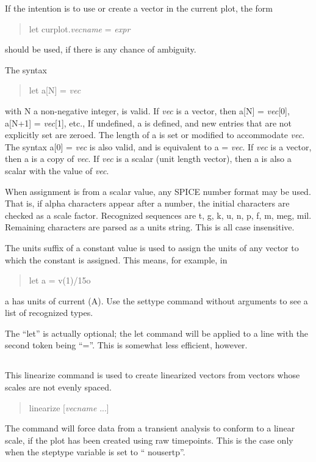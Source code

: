 If the intention is to use or create a vector in the current plot,
the form
\begin{quote}
{\vt let curplot}.{\it vecname} {\vt =} {\it expr}
\end{quote}
should be used, if there is any chance of ambiguity.

The syntax
\begin{quote}
{\vt let a[N] = {\it vec\/}}
\end{quote}
with {\vt N} a non-negative integer, is valid.  If {\it vec\/} is a
vector, then {\vt a[N] = {\it vec\/}[0]}, {\vt a[N+1] = {\it
vec\/}[1]}, etc., If undefined, {\vt a} is defined, and new entries
that are not explicitly set are zeroed.  The length of {\vt a} is set
or modified to accommodate {\it vec\/}.  The syntax {\vt a[0] = {\it
vec\/}} is also valid, and is equivalent to {\vt a = {\it vec\/}}.  If
{\it vec\/} is a vector, then {\vt a} is a copy of {\it vec\/}.  If
{\it vec\/} is a scalar (unit length vector), then {\vt a} is also a
scalar with the value of {\it vec\/}. 

When assignment is from a scalar value, any SPICE number format may be
used.  That is, if alpha characters appear after a number, the initial
characters are checked as a scale factor.  Recognized sequences are t,
g, k, u, n, p, f, m, meg, mil.  Remaining characters are parsed as a
units string.  This is all case insensitive.

The units suffix of a constant value is used to assign the units
of any vector to which the constant is assigned.  This means, for
example, in
\begin{quote}\vt
    let a = v(1)/15o
\end{quote}
{\vt a} has units of current (A).  Use the {\cb settype} command
without arguments to see a list of recognized types.

The ``let'' is actually optional; the {\cb let} command will be
applied to a line with the second token being ``=''.  This is somewhat
less efficient, however.

\subsection{}


This {\cb linearize} command is used to create linearized vectors from
vectors whose scales are not evenly spaced. 
\begin{quote}\vt
linearize [{\it vecname\/} ...]
\end{quote}
The command will force data from a transient analysis to conform to a
linear scale, if the plot has been created using raw timepoints.  This
is the case only when the {\et steptype} variable is set to ``{\vt
nousertp}''. 

